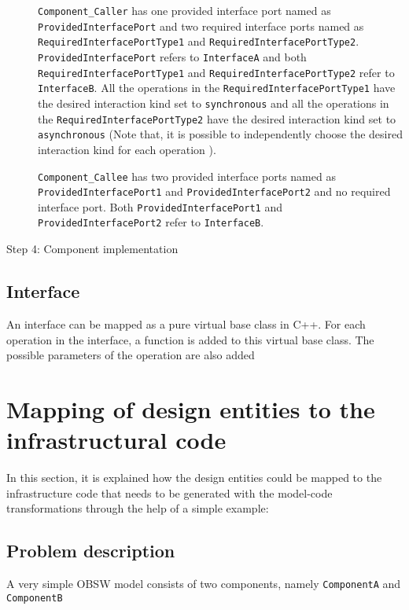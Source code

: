 \begin{description}
\texttt{Component\_Caller} has one provided interface port named as \texttt{ProvidedInterfacePort} and two required interface ports named as \texttt{RequiredInterfacePortType1} and \texttt{RequiredInterfacePortType2}. \texttt{ProvidedInterfacePort} refers to \texttt{InterfaceA} and both \texttt{RequiredInterfacePortType1} and \texttt{RequiredInterfacePortType2} refer to \texttt{InterfaceB}. All the operations in the \texttt{RequiredInterfacePortType1} have the desired interaction kind set to \texttt{synchronous} and all the operations in the \texttt{RequiredInterfacePortType2} have the desired interaction kind set to \texttt{asynchronous} (Note that, it is possible to independently choose the desired interaction kind for each operation \cite{SpecMetamodel}).

\texttt{Component\_Callee} has two provided interface ports named as \texttt{ProvidedInterfacePort1} and \texttt{ProvidedInterfacePort2} and no required interface port. Both \texttt{ProvidedInterfacePort1} and \texttt{ProvidedInterfacePort2} refer to \texttt{InterfaceB}.

\item [Step 4: Component implementation]

\end{description}
   
\subsection{Interface}
An interface can be mapped as a pure virtual base class in C++. For each operation in the interface, a function is added to this virtual base class. The possible parameters of the operation are also added   

\section{Mapping of design entities to the infrastructural code}    
In this section, it is explained how the design entities could be mapped to the infrastructure code that needs to be generated with the model-code transformations through the help of a simple example:

\subsection{Problem description}
A very simple OBSW model consists of two components, namely \texttt{ComponentA} and \texttt{ComponentB} 


